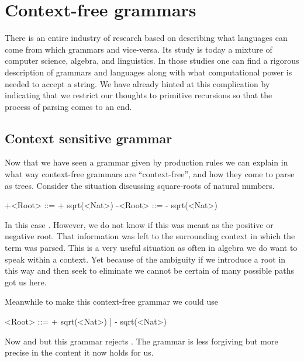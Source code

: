 


\chapter{Context-free grammars}

There is an entire industry of research based on describing what languages 
can come from which grammars and vice-versa.  Its study is today a mixture 
of computer science, algebra, and linguistics.  In those studies one can 
find a rigorous description of grammars and languages along with what 
computational power is needed to  accept a string.  We have already hinted 
at this complication by indicating that we restrict our thoughts to primitive 
recursions so that the process of parsing comes to an end.

\section{Context sensitive grammar}

Now that we have seen a grammar given by production rules we can explain 
in what way context-free grammars are ``context-free'', and how they 
come to parse as trees.  Consider the situation discussing square-roots 
of natural numbers.
\begin{center}
\begin{Gcode}[]
+<Root> ::= + sqrt(<Nat>)
-<Root> ::= - sqrt(<Nat>)
\end{Gcode}
\end{center}
In this case .  However, we do not know if this 
was meant as the positive or negative root.  That information 
was left to the surrounding context in which the term was parsed.  
This is a very useful situation as often in algebra we do want to 
speak within a context.  Yet because of the ambiguity if we 
introduce a root in this way and then seek to eliminate we 
cannot be certain of many possible paths got us here.

Meanwhile 
to make this context-free grammar we could use 
\begin{center}
\begin{Gcode}[]
<Root> ::= + sqrt(<Nat>)
         | - sqrt(<Nat>)
\end{Gcode}
\end{center}
Now  and  but 
this grammar rejects .  The grammar is less forgiving 
but more precise in the content it now holds for us.


